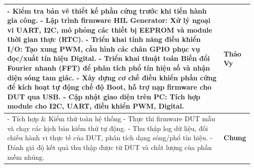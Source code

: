 \begin{longtable}{|>{\raggedright\arraybackslash}p{10.7cm} |>{\centering\arraybackslash}p{2.5cm}|}
    - Kiểm tra bản vẽ thiết kế phần cứng trước khi tiến hành gia công.\newline
    - Lập trình firmware HIL Generator: Xử lý ngoại vi UART, I2C, mô phỏng các thiết bị EEPROM và module thời gian thực (RTC).\newline
    - Triển khai tính năng điều khiển I/O: Tạo xung PWM, cấu hình các chân GPIO phục vụ đọc/xuất tín hiệu Digital.\newline
    - Triển khai thuật toán Biến đổi Fourier nhanh (FFT) để phân tích phổ tín hiệu số và nhận diện sóng tam giác.\newline
    - Xây dựng cơ chế điều khiển phần cứng để kích hoạt tự động chế độ Boot, hỗ trợ nạp firmware cho DUT qua USB.\newline
    - Cập nhật giao diện trên PC: Tích hợp module cho I2C, UART, điều khiển PWM, Digital. & 
    \textbf{Thảo Vy} \\
    \hline
    
    - Tích hợp \& Kiểm thử toàn hệ thống\newline
    - Thực thi firmware DUT mẫu và chạy các kịch bản kiểm thử tự động.\newline
    - Thu thập log dữ liệu, đối chiếu hành vi thực tế của DUT, phân tích dạng sóng/phổ tín hiệu.\newline
    - Đánh giá độ kết quả thu thập được từ DUT và chất lượng của phần mềm nhúng. & 
    \textbf{Chung} \\

\end{longtable}
\endgroup
